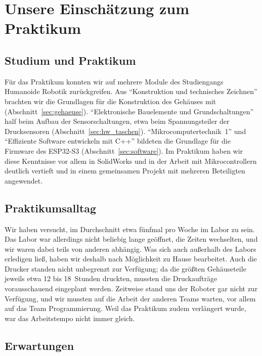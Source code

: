 \chapter{Unsere Einschätzung zum Praktikum}
\label{kap:einschaetzung}

\section{Studium und Praktikum}

Für das Praktikum konnten wir auf mehrere Module des Studiengangs Humanoide Robotik
zurückgreifen. Aus \enquote{Konstruktion und technisches Zeichnen} brachten wir die Grundlagen
für die Konstruktion des Gehäuses mit (Abschnitt~\ref{sec:gehaeuse}). \enquote{Elektronische
Bauelemente und Grundschaltungen} half beim Aufbau der Sensorschaltungen, etwa beim
Spannungsteiler der Drucksensoren (Abschnitt~\ref{sec:hw_taschen}). \enquote{Mikrocomputertechnik~1}
und \enquote{Effiziente Software entwickeln mit C++} bildeten die Grundlage für die Firmware
des ESP32-S3 (Abschnitt~\ref{sec:software}). Im Praktikum haben wir
diese Kenntnisse vor allem in SolidWorks und in der Arbeit mit Mikrocontrollern deutlich
vertieft und in einem gemeinsamen Projekt mit mehreren Beteiligten angewendet.

\section{Praktikumsalltag}

Wir haben versucht, im Durchschnitt etwa fünfmal pro Woche im Labor zu sein. Das Labor war
allerdings nicht beliebig lange geöffnet, die Zeiten wechselten, und wir waren dabei teils
von anderen abhängig. Was sich auch außerhalb des Labors erledigen ließ, haben wir deshalb
nach Möglichkeit zu Hause bearbeitet. Auch die Drucker standen nicht unbegrenzt zur Verfügung;
da die größten Gehäuseteile jeweils etwa 12 bis 18~Stunden druckten, mussten die Druckaufträge
vorausschauend eingeplant werden. Zeitweise stand uns der Roboter gar nicht zur Verfügung, und
wir mussten auf die Arbeit der anderen Teams warten, vor allem auf das Team Programmierung. Weil
das Praktikum zudem verlängert wurde, war das Arbeitstempo nicht immer gleich.

\section{Erwartungen}

